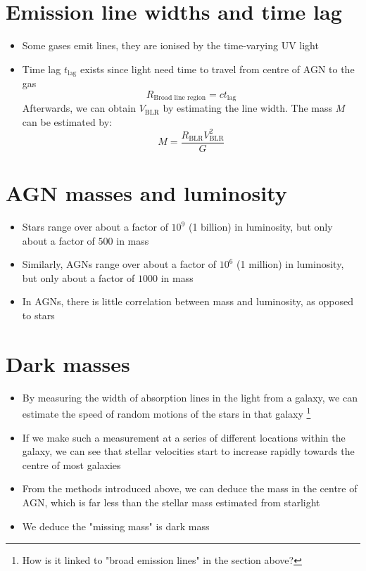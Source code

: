 \documentclass{article}
\begin{document}
\section{Emission line widths and time lag}
\begin{itemize}
\item Some gases emit lines, they are ionised by the time-varying UV light
\item Time lag $t_\text{lag}$ exists since light need time to travel from centre of AGN to the gas
\begin{equation}
R_\text{Broad line region}=ct_\text{lag}
\end{equation}
Afterwards, we can obtain $V_\text{BLR}$ by estimating the line width. The mass $M$ can be estimated by:
\begin{equation}
M=\frac{R_\text{BLR}V_\text{BLR}^2}{G}
\end{equation}
\end{itemize}
\section{AGN masses and luminosity}
\begin{itemize}
\item Stars range over about a factor of $10^9$ (1 billion) in luminosity, but only about a factor of $500$ in mass
\item Similarly, AGNs range over about a factor of $10^6$ (1 million) in luminosity, but only about a factor of $1000$ in mass
\item In AGNs, there is little correlation between mass and luminosity, as opposed to stars
\end{itemize}
\section{Dark masses}
\begin{itemize}
\item By measuring the width of absorption lines in the light from a galaxy, we can estimate the speed of random motions of the stars in that galaxy \footnote{How is it linked to "broad emission lines" in the section above?}
\item If we make such a measurement at a series of different locations within the galaxy, we can see that stellar velocities start to increase rapidly towards the centre of most galaxies
\item From the methods introduced above, we can deduce the mass in the centre of AGN, which is far less than the stellar mass estimated from starlight 
\item We deduce the "missing mass" is dark mass
\end{itemize}
\end{document}
